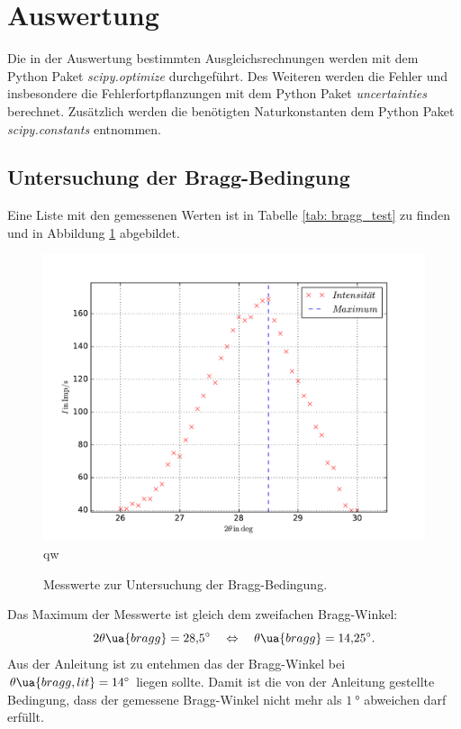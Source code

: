 \section{Auswertung}
Die in der Auswertung bestimmten Ausgleichsrechnungen werden mit
dem Python Paket \emph{scipy.optimize}\cite{scipy} durchgeführt.
Des Weiteren werden die Fehler und insbesondere die Fehlerfortpflanzungen
mit dem Python Paket \emph{uncertainties}\cite{uncertainties} berechnet.
Zusätzlich werden die benötigten Naturkonstanten dem Python Paket \emph{scipy.constants}\cite{scipy}
entnommen.
\FloatBarrier
\subsection{Untersuchung der Bragg-Bedingung}
Eine Liste mit den gemessenen Werten ist in Tabelle \ref{tab: bragg_test} zu finden und in Abbildung \ref{fig: bragg_plot} abgebildet.

\begin{figure}
  \centering
  \includegraphics[width=0.8 \textwidth]{../Messdaten/bragbed.pdf}
qw  \caption{Messwerte zur Untersuchung der Bragg-Bedingung.}
  \label{fig: bragg_plot}
\end{figure}
Das Maximum der Messwerte ist gleich dem zweifachen Bragg-Winkel:
\begin{equation}
  \label{eq:bestimmt_bragg_winkel}
  2\theta\ua{bragg}=\SI{28.5}{\degree} \quad \Leftrightarrow \quad \theta\ua{bragg}=\SI{14.25}{\degree}.
\end{equation} %
Aus der Anleitung \cite{} ist zu entehmen das der Bragg-Winkel bei $\theta\ua{bragg,lit}=\SI{14}{\degree}$ liegen sollte.
Damit ist die von der Anleitung gestellte Bedingung, dass der gemessene Bragg-Winkel nicht mehr
als $\SI{1}{\degree}$ abweichen darf erfüllt.
\FloatBarrier


